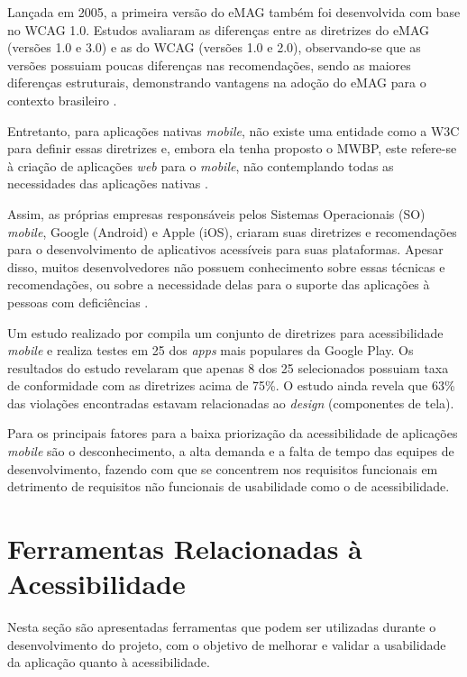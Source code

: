 Lançada em 2005, a primeira versão do eMAG também foi desenvolvida com base no WCAG 1.0. Estudos avaliaram as diferenças entre as diretrizes do eMAG
(versões 1.0 e 3.0) e as do WCAG (versões 1.0 e 2.0), observando-se que as versões possuiam poucas
diferenças nas recomendações, sendo as maiores diferenças estruturais, demonstrando vantagens na adoção do eMAG para o
contexto brasileiro \cite{Bach_2009,Rocha_2013}.

Entretanto, para aplicações nativas \textit{mobile}, não existe uma entidade como a W3C para definir essas diretrizes e, embora
ela tenha proposto o MWBP, este refere-se à criação de aplicações \emph{web} para o \emph{mobile}, não contemplando todas
as necessidades das aplicações nativas \cite{W3C_2008}.

Assim, as próprias empresas responsáveis pelos Sistemas Operacionais (SO) \emph{mobile}, Google (Android) e Apple (iOS),
criaram suas diretrizes e recomendações para o desenvolvimento de aplicativos acessíveis para suas plataformas.
Apesar disso, muitos desenvolvedores não possuem conhecimento sobre essas técnicas e recomendações, ou sobre a necessidade delas
para o suporte das aplicações à pessoas com deficiências \cite{Quispe2020,Bi2021}.

Um estudo realizado por  compila um conjunto de diretrizes para acessibilidade \textit{mobile} e realiza
testes em 25 dos \textit{apps} mais populares da Google Play. Os resultados do estudo revelaram que apenas 8 dos 25 selecionados
possuiam taxa de conformidade com as diretrizes acima de 75\%. O estudo ainda revela que 63\% das violações encontradas estavam
relacionadas ao \textit{design} (componentes de tela).

Para  os principais fatores para a baixa priorização da acessibilidade de aplicações \textit{mobile}
são o desconhecimento, a alta demanda e a falta de tempo das equipes de desenvolvimento, fazendo com que se concentrem nos
requisitos funcionais em detrimento de requisitos não funcionais de usabilidade como o de acessibilidade.

\section{Ferramentas Relacionadas à Acessibilidade}
Nesta seção são apresentadas ferramentas que podem ser utilizadas durante o desenvolvimento do projeto, com o objetivo de melhorar e validar a usabilidade
da aplicação quanto à acessibilidade.

